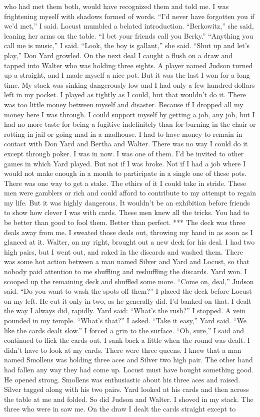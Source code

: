 \documentclass{novel}
\begin{document}
who had met them both, would have recognized them and told me. I was frightening myself with shadows formed of words. “I’d never have forgotten you if we’d met,” I said. Locust mumbled a belated introduction. “Berkowitz,” she said, leaning her arms on the table. “I bet your friends call you Berky.” “Anything you call me is music,” I said. “Look, the boy is gallant,” she said. “Shut up and let’s play,” Don Yard growled. On the next deal I caught a flush on a draw and tapped into Walter who was holding three eights. A player named Judson turned up a straight, and I made myself a nice pot. But it was the last I won for a long time. My stack was sinking dangerously low and I had only a few hundred dollars left in my pocket. I played as tightly as I could, but that wouldn’t do it. There was too little money between myself and disaster. Because if I dropped all my money here I was through. I could support myself by getting a job, any job, but I had no more taste for being a fugitive indefinitely than for burning in the chair or rotting in jail or going mad in a madhouse. I had to have money to remain in contact with Don Yard and Bertha and Walter. There was no way I could do it except through poker. I was in now. I was one of them. I’d be invited to other games in which Yard played. But not if I was broke. Not if I had a job where I would not make enough in a month to participate in a single one of these pots. There was one way to get a stake. The ethics of it I could take in stride. These men were gamblers or rich and could afford to contribute to my attempt to regain my life. But it was highly dangerous. It wouldn’t be an exhibition before friends to show how clever I was with cards. These men knew all the tricks. You had to be better than good to fool them. Better than perfect. *** The deck was three deals away from me. I sweated those deals out, throwing my hand in as soon as I glanced at it. Walter, on my right, brought out a new deck for his deal. I had two high pairs, but I went out, and raked in the discards and washed them. There was some hot action between a man named Silver and Yard and Locust, so that nobody paid attention to me shuffling and reshuffling the discards. Yard won. I scooped up the remaining deck and shuffled some more. “Come on, deal,” Judson said. “Do you want to wash the spots off them?” I placed the deck before Locust on my left. He cut it only in two, as he generally did. I’d banked on that. I dealt the way I always did, rapidly. Yard said: “What’s the rush?” I stopped. A vein pounded in my temple. “What’s that?” I asked. “Take it easy,” Yard said. “We like the cards dealt slow.” I forced a grin to the surface. “Oh, sure,” I said and continued to flick the cards out. I sank back a little when the round was dealt. I didn’t have to look at my cards. There were three queens. I knew that a man named Smollens was holding three aces and Silver two high pair. The other hand had fallen any way they had come up. Locust must have bought something good. He opened strong. Smollens was enthusiastic about his three aces and raised. Silver tagged along with his two pairs. Yard looked at his cards and then across the table at me and folded. So did Judson and Walter. I shoved in my stack. The three who were in saw me. On the draw I dealt the cards straight except to 
\end{document}

